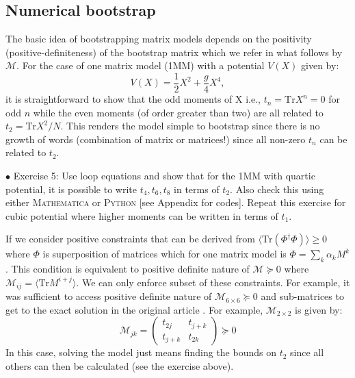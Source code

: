 \documentclass[11pt]{article}
\newcommand{\MA}{\textsc{Mathematica }}
\newcommand{\PY}{\textsc{Python }}
\begin{document}
\subsection{Numerical bootstrap}

The basic idea of bootstrapping matrix models depends on the 
positivity (positive-definiteness) of the bootstrap matrix which we refer in what follows 
by $\mathcal{M}$. For the case of one matrix model (1MM) with a potential $V(X)$ given by: 
\begin{equation}
    V(X) = \frac12 X^2 + \frac{g}{4} X^4, 
\end{equation}
it is straightforward to show that the odd moments of X i.e., $ t_{n} = \mbox{Tr} X^n = 0$ for odd $n$
while the even moments (of order greater than two) are all related to $t_{2} = \mbox{Tr} X^2/N$. This renders the 
model simple to bootstrap since there is no growth of words (combination of matrix or matrices!)
since all non-zero $t_{n}$ can be related to $t_{2}$. 
\begin{mdframed}[backgroundcolor=blue!3] 
	\textsc{} 
	$\bullet$ Exercise 5: Use loop equations and show that for the 1MM with quartic potential, it is possible to write $t_{4}, t_{6}, t_{8}$ in terms of $t_{2}$. 
	Also check this using either \MA or \PY [see Appendix for codes]. Repeat this exercise for cubic potential where higher moments can be written in terms of $t_1$.  
\end{mdframed} 
If we consider positive constraints that can be derived from $\langle \mbox{Tr}(\Phi^{\dagger}\Phi) \rangle \ge 0 $
where $\Phi$ is superposition of matrices which for one matrix model is 
$ \Phi = \sum_{k} \alpha_{k} M^{k}$. This condition is equivalent to positive definite nature of
$\mathcal{M} \succeq 0 $ where $ \mathcal{M}_{ij} = \langle \mbox{Tr} M^{i+j} \rangle$. 
We can only enforce subset of these constraints. For example, it was sufficient to 
access positive definite nature of $\mathcal{M}_{6 \times 6} \succeq 0 $ and sub-matrices 
to get to the exact solution in the original article \cite{Lin:2020mme}. 
For example, $\mathcal{M}_{2 \times 2}$ is given by:
\begin{equation}
	\mathcal{M}_{jk} = 
	\begin{pmatrix}
		t_{2j} & t_{j+k}  \\
		t_{j+k} & t_{2k}  
	\end{pmatrix}  \succeq 0
\end{equation}
In this case, solving the model just means finding the bounds on $t_{2}$ since all others can then be calculated (see the exercise above). 
\end{document}
